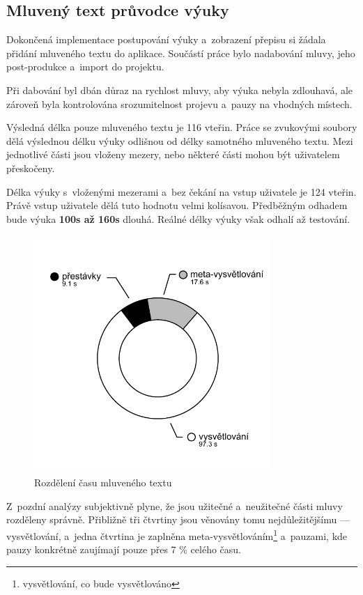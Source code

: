\subsection{Mluvený text průvodce
výuky}\label{mluvenuxfd-text-prux16fvodce-vuxfduky}

Dokončená implementace postupování výuky a~zobrazení přepisu si žádala
přidání mluveného textu do aplikace. Součástí práce bylo nadabování
mluvy, jeho post-produkce a~import do projektu.

Při dabování byl dbán důraz na rychlost mluvy, aby výuka nebyla
zdlouhavá, ale zároveň byla kontrolována srozumitelnost projevu a~pauzy
na vhodných místech.

Výsledná délka pouze mluveného textu je 116 vteřin. Práce se zvukovými
soubory dělá výslednou délku výuky odlišnou od délky samotného mluveného
textu. Mezi jednotlivé části jsou vloženy mezery, nebo některé části
mohou být uživatelem přeskočeny. 

Délka výuky s~vloženými mezerami a~bez
čekání na vstup uživatele je 124 vteřin. Právě vstup uživatele dělá tuto
hodnotu velmi kolísavou. Předběžným odhadem bude výuka \textbf{100s až
160s} dlouhá. Reálné délky výuky však odhalí až testování.

\begin{figure}[h!]
\centering
\includegraphics[height=9cm]{src/assets/time-chart.pdf}
\caption{Rozdělení času mluveného textu}
\end{figure}

Z~pozdní analýzy subjektivně plyne, že jsou užitečné a~neužitečné
části mluvy rozděleny správně. Přibližně tři čtvrtiny jsou věnovány
tomu nejdůležitějšímu --- vysvětlování, a~jedna čtvrtina je zaplněna
meta-vysvětlováním\footnote{vysvětlování, co bude vysvětlováno} a~pauzami, kde pauzy konkrétně zaujímají pouze přes 7
\% celého času.

